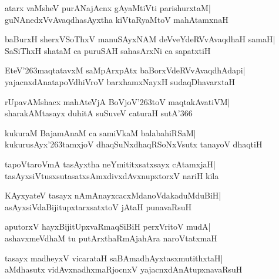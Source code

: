 \documentclass[twoside,12pt,openright]{book}
\def\S{\char'263}
\newcounter{shloka}[chapter]
\begin{document}
\begin{shloka}%
atarx vaMsheV purANajAcnx gAyaMtiVti parishurxtaM|\\
guNAnedxVvAvaqdhasAyxtha kiVtaRyaMtoV mahAtamxnaH
\end{shloka}

\begin{shloka}%
baBurxH sherxVSoThxV manuSAyxNAM deVveYdeRVvAvaqdhaH samaH|\\
SaSiThxH shataM ca puruSAH sahasArxNi ca sapatxtiH
\end{shloka}

\begin{shloka}%
EteV\S maqtatavxM saMpArxpAtx baBorxVdeRVvAvaqdhAdapi|\\
yajacnxdAnatapoVdhiVroV barxhamxNayxH sudaqDhavarxtaH
\end{shloka}

\begin{shloka}%
rUpavAMshacx mahAteVjA BoVjoV\S toV maqtakAvatiVM|\\
sharakAMtasayx duhitA suSuveV caturaH sutA\char'366
\end{shloka}

\begin{shloka}%
kukuraM BajamAnaM ca samiVkaM balabahiRSaM|\\
kukurusAyx\S tamxjoV dhaqSuNxdhaqRSoNxVsutx tanayoV dhaqtiH
\end{shloka}

\begin{shloka}%
tapoVtaroVmA tasAyxtha neYmititxsatxsayx cAtamxjaH|\\
tasAyxsiVtusxsutasatxsAmxdivxdAvxnupxtorxV nariH kila
\end{shloka}

\begin{shloka}%
KAyxyateV tasayx nAmAnayxcacxMdanoVdakaduMduBiH|\\
asAyxsiVdaBijitupxtarxsatxtoV jAtaH punavaRsuH
\end{shloka}

\begin{shloka}%
aputorxV hayxBijitUpxvaRmaqSiBiH perxVritoV mudA|\\
ashavxmeVdhaM tu putArxthaRmAjahAra naroVtatxmaH
\end{shloka}

\begin{shloka}%
tasayx madheyxV vicarataH saBAmadhAyxtasxmutithxtaH|\\
aMdhasutx vidAvxnadhxmaRjocnxV yajacnxdAnAtupxnavaRsuH
\end{shloka}
\end{document}
